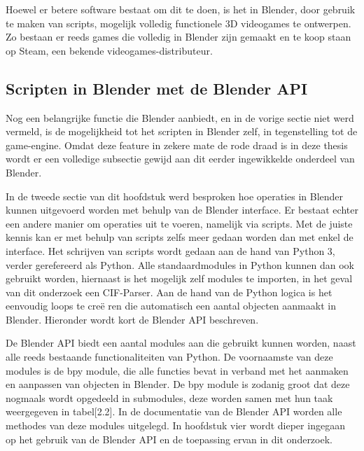 \par
Hoewel er betere software bestaat om dit te doen, is het in Blender, door gebruik te maken van scripts, mogelijk volledig functionele 3D videogames te ontwerpen. Zo bestaan er reeds games die volledig in Blender zijn gemaakt en te koop staan op Steam, een bekende videogames-distributeur.

\subsection{Scripten in Blender met de Blender API}
Nog een belangrijke functie die Blender aanbiedt, en in de vorige sectie niet werd vermeld, is de mogelijkheid tot het scripten in Blender zelf, in tegenstelling tot de game-engine. Omdat deze feature in zekere mate de rode draad is in deze thesis wordt er een volledige subsectie gewijd aan dit eerder ingewikkelde onderdeel van Blender.

\par
In de tweede sectie van dit hoofdstuk werd besproken hoe operaties in Blender kunnen uitgevoerd worden met behulp van de Blender interface. Er bestaat echter een andere manier om operaties uit te voeren, namelijk via scripts. Met de juiste kennis kan er met behulp van scripts zelfs meer gedaan worden dan met enkel de interface. 
Het schrijven van scripts wordt gedaan aan de hand van Python 3, verder gerefereerd als Python. Alle standaardmodules in Python kunnen dan ook gebruikt worden, hiernaast is het mogelijk zelf modules te importen, in het geval van dit onderzoek een CIF-Parser. Aan de hand van de Python logica is het eenvoudig loops te cre\"{e} ren die automatisch een aantal objecten aanmaakt in Blender. Hieronder wordt kort de Blender API beschreven.

\par
De Blender API biedt een aantal modules aan die gebruikt kunnen worden, naast alle reeds bestaande functionaliteiten van Python. De voornaamste van deze modules is de bpy module, die alle functies bevat in verband met het aanmaken en aanpassen van objecten in Blender. De bpy module is zodanig groot dat deze nogmaals wordt opgedeeld in submodules, deze worden samen met hun taak weergegeven in tabel[2.2]. In de documentatie van de Blender API worden alle methodes van deze modules uitgelegd. In hoofdstuk vier wordt dieper ingegaan op het gebruik van de Blender API en de toepassing ervan in dit onderzoek.

